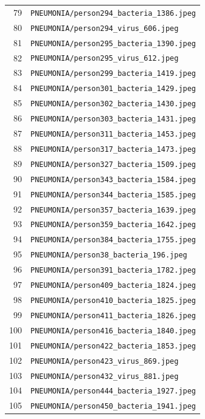 \begin{longtable}{r p{12cm}}
79 & \texttt{PNEUMONIA/person294\_bacteria\_1386.jpeg} \\
80 & \texttt{PNEUMONIA/person294\_virus\_606.jpeg} \\
81 & \texttt{PNEUMONIA/person295\_bacteria\_1390.jpeg} \\
82 & \texttt{PNEUMONIA/person295\_virus\_612.jpeg} \\
83 & \texttt{PNEUMONIA/person299\_bacteria\_1419.jpeg} \\
84 & \texttt{PNEUMONIA/person301\_bacteria\_1429.jpeg} \\
85 & \texttt{PNEUMONIA/person302\_bacteria\_1430.jpeg} \\
86 & \texttt{PNEUMONIA/person303\_bacteria\_1431.jpeg} \\
87 & \texttt{PNEUMONIA/person311\_bacteria\_1453.jpeg} \\
88 & \texttt{PNEUMONIA/person317\_bacteria\_1473.jpeg} \\
89 & \texttt{PNEUMONIA/person327\_bacteria\_1509.jpeg} \\
90 & \texttt{PNEUMONIA/person343\_bacteria\_1584.jpeg} \\
91 & \texttt{PNEUMONIA/person344\_bacteria\_1585.jpeg} \\
92 & \texttt{PNEUMONIA/person357\_bacteria\_1639.jpeg} \\
93 & \texttt{PNEUMONIA/person359\_bacteria\_1642.jpeg} \\
94 & \texttt{PNEUMONIA/person384\_bacteria\_1755.jpeg} \\
95 & \texttt{PNEUMONIA/person38\_bacteria\_196.jpeg} \\
96 & \texttt{PNEUMONIA/person391\_bacteria\_1782.jpeg} \\
97 & \texttt{PNEUMONIA/person409\_bacteria\_1824.jpeg} \\
98 & \texttt{PNEUMONIA/person410\_bacteria\_1825.jpeg} \\
99 & \texttt{PNEUMONIA/person411\_bacteria\_1826.jpeg} \\
100 & \texttt{PNEUMONIA/person416\_bacteria\_1840.jpeg} \\
101 & \texttt{PNEUMONIA/person422\_bacteria\_1853.jpeg} \\
102 & \texttt{PNEUMONIA/person423\_virus\_869.jpeg} \\
103 & \texttt{PNEUMONIA/person432\_virus\_881.jpeg} \\
104 & \texttt{PNEUMONIA/person444\_bacteria\_1927.jpeg} \\
105 & \texttt{PNEUMONIA/person450\_bacteria\_1941.jpeg} \\

\end{longtable}
